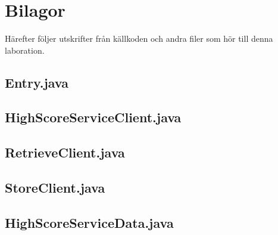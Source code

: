 \documentclass[a4paper, 12pt]{article}
\begin{document}



\newpage
\appendix
{}
\section{Bilagor}\label{Bilagor}
Härefter följer utskrifter från källkoden och andra filer som hör till
denna laboration.

\newpage
\subsection{Entry.java}\label{Entry.java}
\begin{footnotesize}
  
\end{footnotesize}

\newpage
\subsection{HighScoreServiceClient.java}\label{HighScoreServiceClient.java}
\begin{footnotesize}
  
\end{footnotesize}

\newpage
\subsection{RetrieveClient.java}\label{RetrieveClient.java}
\begin{footnotesize}
  
\end{footnotesize}

\newpage
\subsection{StoreClient.java}\label{StoreClient.java}
\begin{footnotesize}
  
\end{footnotesize}

\newpage
\subsection{HighScoreServiceData.java}\label{HighScoreServiceData.java}
\begin{footnotesize}
  
\end{footnotesize}
\end{document}
